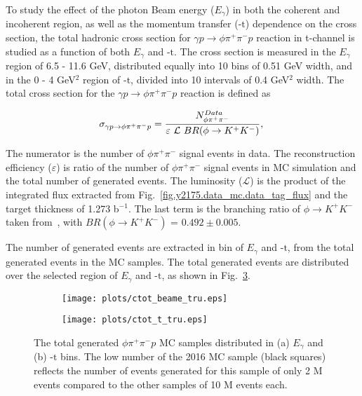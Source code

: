 To study the effect of the photon Beam energy ($E_{\gamma}$) in both the coherent and incoherent region, as well as the momentum transfer ($\mbox{-t}$) dependence on the cross section, the total hadronic cross section for $\gamma p \rightarrow \phi \pi^{+} \pi^{-} p$ reaction in t-channel is studied as a function of both $E_{\gamma}$ and $\mbox{-t}$. The cross section is measured in the $E_{\gamma}$ region of 6.5 - 11.6 GeV, distributed equally into 10 bins of 0.51 GeV width, and in the 0 - 4 GeV$^2$ region of $\mbox{-t}$, divided into 10 intervals of 0.4 GeV$^2$ width. The total cross section for the $\gamma p \rightarrow \phi \pi^{+} \pi^{-} p$ reaction is defined as

\begin{equation}
    \label{eq.y2175.xsec_ul.phi2pi}
    \sigma_{\gamma p \rightarrow \phi \pi^{+} \pi^{-} p} = \frac{N_{\phi\pi^+\pi^-}^{Data}}{\varepsilon~\mathcal{L}~BR(\phi\rightarrow K^{+}K^{-})},\\
\end{equation}

\noindent The numerator is the number of $\phi\pi^+\pi^-$ signal events in data. The reconstruction efficiency ($\varepsilon$) is ratio of the number of $\phi\pi^+\pi^-$ signal events in MC simulation and the total number of generated events. The luminosity ($\mathcal{L}$) is the product of the integrated flux extracted from Fig.~\ref{fig.y2175.data_mc.data_tag_flux} and the target thickness of 1.273 b$^{-1}$. The last term is the branching ratio of $\phi\rightarrow K^{+}K^{-}$ taken from~\cite{Tanabashi18}, with $BR(\phi\rightarrow K^{+}K^{-})$ = $0.492 \pm 0.005$.
\par The number of generated events are extracted in bin of $E_{\gamma}$ and $\mbox{-t}$, from the total generated events in the MC samples. The total generated events are distributed over the selected region of $E_{\gamma}$ and $\mbox{-t}$, as shown in Fig.~\ref{fig.y2175.xsec_ul.phi2pi.1}.

\begin{figure}[H]
    \centering
    \begin{subfigure}[b]{0.5\textwidth}
        \texttt{[image: plots/ctot\_beame\_tru.eps]}
        \caption{}
        \label{fig.y2175.xsec_ul.phi2pi.1.a}
    \end{subfigure}\hfill
    \begin{subfigure}[b]{0.5\textwidth}
        \texttt{[image: plots/ctot\_t\_tru.eps]}
        \caption{}
        \label{fig.y2175.xsec_ul.phi2pi.1.b}
    \end{subfigure}
    \caption{\label{fig.y2175.xsec_ul.phi2pi.1}The total generated $\phi \pi^{+} \pi^{-} p$ MC samples distributed in (a) $E_{\gamma}$ and (b) $\mbox{-t}$ bins. The low number of the 2016 MC sample (black squares) reflects the number of events generated for this sample of only 2 M events compared to the other samples of 10 M events each.}
\end{figure}

